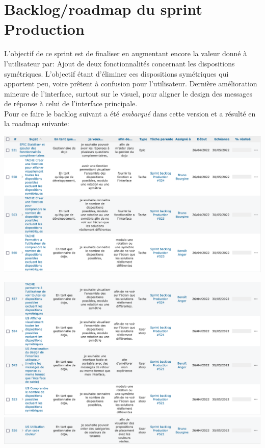 \section{Backlog/roadmap du sprint Production}

L’objectif de ce sprint est de finaliser en augmentant encore la valeur donné à l'utilisateur par:
Ajout de deux fonctionnalités concernant les dispositions symétriques. L’objectif étant d'éliminer ces dispositions
symétriques qui apportent peu, voire prêtent à confusion pour l’utilisateur.
Dernière amélioration mineure de l’interface, surtout sur le visuel, pour aligner le design des messages de réponse
à celui de l’interface principale.\\

Pour ce faire le backlog suivant a été \emph{embarqué} dans cette version et a résulté en la roadmap suivante:


\begin{center}
    \includegraphics[width=17cm]{images/roadmap-prod-part1.png}
\end{center}

\begin{center}
    \includegraphics[width=17cm]{images/roadmap-prod-part2.png}
    \includegraphics[width=17cm]{images/roadmap-prod-part3.png}
\end{center}

